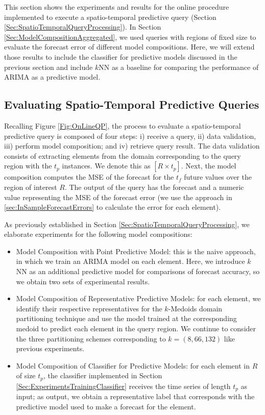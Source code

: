 This section shows the experiments and results for the online procedure implemented to execute a spatio-temporal predictive query (Section \ref{Sec:SpatioTemporalQueryProcessing}). In Section \ref{Sec:ModelCompositionAggregated}, we used queries with regions of fixed size to evaluate the forecast error of different model compositions. Here, we will extend those results to include the classifier for predictive models discussed in the previous section and include $k$NN as a baseline for comparing the performance of ARIMA as a predictive model.

\subsection{Evaluating Spatio-Temporal Predictive Queries}
\label{Sec:ExperimentsQueries}

Recalling Figure \ref{Fig:OnLineQP}, the process to evaluate a spatio-temporal predictive query is composed of four steps: i) receive a query, ii) data validation, iii) perform model composition; and iv) retrieve query result. The data validation consists of extracting elements from the domain corresponding to the query region with the $t_p$ instances. We denote this as $[R \times t_{p}]$. Next, the model composition computes the MSE of the forecast for the $t_{f}$ future values over the region of interest $R$. The output of the query has the forecast and a numeric value representing the MSE of the forecast error (we use the approach in \ref{sec:InSampleForecastErrors} to calculate the error for each element). 

As previously established in Section \ref{Sec:SpatioTemporalQueryProcessing}, we elaborate experiments for the following model compositions:

\begin{itemize}
	\item Model Composition with Point Predictive Model: this is the naive approach, in which we train an ARIMA model on each element. Here, we introduce $k$NN as an additional predictive model for comparisons of forecast accuracy, so we obtain two sets of experimental results.
	\item Model Composition of Representative Predictive Models: for each element, we identify their respective representatives for the $k$-Medoids domain partitioning technique and use the model trained at the corresponding medoid to predict each element in the query region. We continue to consider the three partitioning schemes corresponding to $k=(8, 66, 132)$ like previous experiments.
	\item Model Composition of Classifier for Predictive Models: for each element in $R$ of size $t_{p}$, the classifier implemented in Section \ref{Sec:ExperimentsTrainingClassifier} receives the time series of length $t_{p}$ as input; as output, we obtain a representative label that corresponds with the predictive model used to make a forecast for the element.
\end{itemize}

